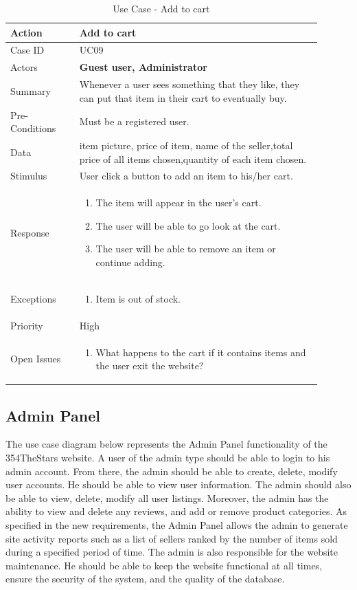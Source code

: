 \documentclass[11pt]{article}
\newcounter{use case ID}
\newcommand\tabularhead[1]{
    \begin{table}[ht]
        \addtocounter{use case ID}{1}
        \caption{Use Case \arabic{use case ID} - #1}
        \vspace{0.2cm}
        \begin{tabular}{|p{0.2\linewidth}|p{0.70\linewidth}|}
            \hline
            \textbf{Action} & \textbf{#1} \\
            \hline}
\newcommand\addrow[2]{#1 & #2\\ \hline}
\newcommand\addmulrow[2]{ \begin{minipage}[t][][t]{2.5cm}#1\end{minipage}
                &\begin{minipage}[t][][t]{11cm}
                    \begin{enumerate}[itemsep=-1ex] #2   \end{enumerate}
                \end{minipage}\vfill\\ \hline}
\newenvironment{usecase}{\tabularhead}
        {\hline\end{tabular}\end{table}}
\newcounter{req ID}
\begin{document}
\begin{usecase}{Add to cart}
    \addrow{Case ID}{UC09}
    \addrow{Actors}{\textbf{Guest user, Administrator}}
    \addrow{Summary}{Whenever a user sees something that they like, they can put that item in their cart to eventually buy.}
    \addrow{Pre-Conditions}{
       Must be a \index{registered user}registered user.
        }
    \addrow{\index{data}Data}{
item picture, price of item, name of the \index{seller}seller,total price of all items chosen,quantity of each item chosen.}
    \addrow{Stimulus}{User click a button to add an item to his/her cart.}
    \addmulrow{Response}{
        \item The item will appear in the user's cart.
        \item The user will be able to go look at the cart.
        \item The user will be able to remove an item or continue adding.
    }
    \addmulrow{Exceptions}{ 
        \item Item is out of stock.
    }
    \addrow{Priority}{High}
    \addmulrow{Open Issues}{
        \item What happens to the cart if it contains items and the user exit the website?
    }
\end{usecase}
\clearpage


\subsection{Admin Panel}

The use case diagram below represents the Admin Panel functionality of the 354TheStars website. A user of the admin type should be able to login to his admin account. From there, the admin should be able to create, delete, modify user accounts. He should be able to view user information. The admin should also be able to view, delete, modify all user listings. Moreover, the admin has the ability to view and delete any reviews, and add or remove product categories. As specified in the new requirements, the Admin Panel allows the admin to generate site activity reports such as a list of sellers ranked by the number of items sold during a specified period of time. The admin is also responsible for the website maintenance. He should be able to keep the website functional at all times, ensure the security of the system, and the quality of the database.
\end{document}
